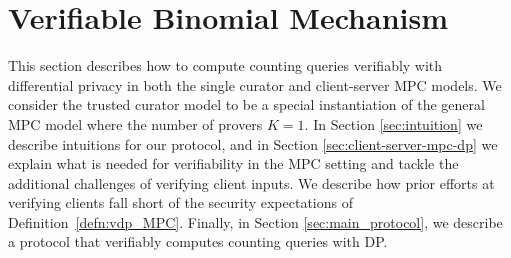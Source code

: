 \section{Verifiable Binomial Mechanism}
\label{sec:single_curator_hist}

This section describes how to compute counting queries verifiably with differential privacy in both the single curator and client-server MPC models. 
We consider the trusted curator model to be a special instantiation of the general MPC model where the number of provers $K=1$.
In Section \ref{sec:intuition} we describe intuitions for our protocol, and in Section \ref{sec:client-server-mpc-dp} we explain what is needed for verifiability in the MPC setting and tackle the additional challenges of verifying client inputs.
We describe how prior efforts at verifying clients fall short of the security expectations of Definition~\ref{defn:vdp_MPC}. 
Finally, in Section \ref{sec:main_protocol}, we describe a protocol that verifiably computes counting queries with DP.

